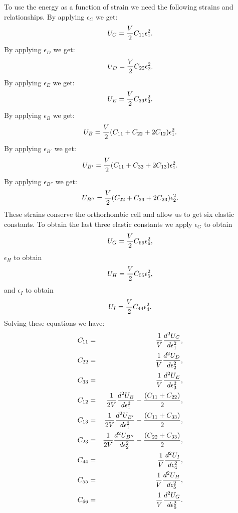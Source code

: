 \documentclass[12pt,a4paper]{article}
\begin{document}
To use the energy as a function of strain we need the following strains
and relationships. 
By applying $\epsilon_C$ we get:
\begin{equation}
U_C= {V \over 2} C_{11} \epsilon_1^2.
\end{equation}
By applying $\epsilon_D$ we get:
\begin{equation}
U_D= {V \over 2} C_{22} \epsilon_2^2.
\end{equation}
By applying $\epsilon_E$ we get:
\begin{equation}
U_E= {V \over 2} C_{33} \epsilon_3^2.
\end{equation}
By applying $\epsilon_B$ we get:
\begin{equation}
U_B= {V \over 2} (C_{11} + C_{22} + 2 C_{12}) \epsilon_1^2.
\end{equation}
By applying $\epsilon_{B'}$ we get: 
\begin{equation}
U_{B'}= {V \over 2} (C_{11} + C_{33} + 2 C_{13}) \epsilon_1^2.
\end{equation}
By applying $\epsilon_{B''}$ we get:
\begin{equation}
U_{B''}= {V \over 2} (C_{22} + C_{33} + 2 C_{23}) \epsilon_2^2.
\end{equation}
These strains conserve the orthorhombic cell and allow us to get
six elastic constants. To obtain the last three elastic constants we 
apply $\epsilon_G$ to obtain
\begin{equation}
U_G= {V \over 2} C_{66} \epsilon_6^2,
\end{equation}
$\epsilon_H$ to obtain
\begin{equation}
U_H= {V \over 2} C_{55} \epsilon_5^2,
\end{equation}
and $\epsilon_I$ to obtain
\begin{equation}
U_I= {V \over 2} C_{44} \epsilon_4^2.
\end{equation}
Solving these equations we have:
\begin{eqnarray}
C_{11}&=&{1 \over V} {d^2 U_C \over d \epsilon_1^2}, \\ 
C_{22}&=&{1 \over V} {d^2 U_D \over d \epsilon_2^2}, \\ 
C_{33}&=&{1 \over V} {d^2 U_E \over d \epsilon_3^2}, \\ 
C_{12}&=&{1 \over 2 V} {d^2 U_B \over d \epsilon_1^2} - 
{(C_{11}+C_{22})\over 2}, \\
C_{13}&=&{1 \over 2 V} {d^2 U_{B'} \over d \epsilon_1^2} - 
{(C_{11}+C_{33})\over 2}, \\
C_{23}&=&{1 \over 2 V} {d^2 U_{B''} \over d \epsilon_2^2} - 
{(C_{22}+C_{33})\over 2}, \\
C_{44}&=&{1 \over V} {d^2 U_I \over d \epsilon_4^2}, \\
C_{55}&=&{1 \over V} {d^2 U_H \over d \epsilon_5^2}, \\
C_{66}&=&{1 \over V} {d^2 U_G \over d \epsilon_6^2}.
\end{eqnarray}
\end{document}
